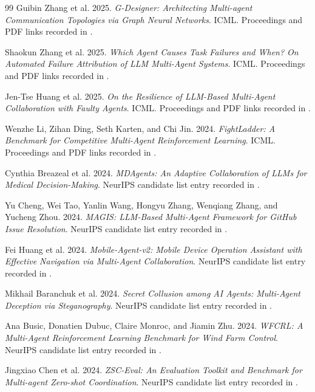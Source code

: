 \documentclass[11pt]{article}
\begin{document}
\begin{thebibliography}{99}
Guibin Zhang et al. 2025. \emph{G-Designer: Architecting Multi-agent Communication Topologies via Graph Neural Networks}. ICML. Proceedings and PDF links recorded in \cite{icml_list}.

Shaokun Zhang et al. 2025. \emph{Which Agent Causes Task Failures and When? On Automated Failure Attribution of LLM Multi-Agent Systems}. ICML. Proceedings and PDF links recorded in \cite{icml_list}.

Jen-Tse Huang et al. 2025. \emph{On the Resilience of LLM-Based Multi-Agent Collaboration with Faulty Agents}. ICML. Proceedings and PDF links recorded in \cite{icml_list}.

Wenzhe Li, Zihan Ding, Seth Karten, and Chi Jin. 2024. \emph{FightLadder: A Benchmark for Competitive Multi-Agent Reinforcement Learning}. ICML. Proceedings and PDF links recorded in \cite{icml_list}.

Cynthia Breazeal et al. 2024. \emph{MDAgents: An Adaptive Collaboration of LLMs for Medical Decision-Making}. NeurIPS candidate list entry recorded in \cite{neurips_list}.

Yu Cheng, Wei Tao, Yanlin Wang, Hongyu Zhang, Wenqiang Zhang, and Yucheng Zhou. 2024. \emph{MAGIS: LLM-Based Multi-Agent Framework for GitHub Issue Resolution}. NeurIPS candidate list entry recorded in \cite{neurips_list}.

Fei Huang et al. 2024. \emph{Mobile-Agent-v2: Mobile Device Operation Assistant with Effective Navigation via Multi-Agent Collaboration}. NeurIPS candidate list entry recorded in \cite{neurips_list}.

Mikhail Baranchuk et al. 2024. \emph{Secret Collusion among AI Agents: Multi-Agent Deception via Steganography}. NeurIPS candidate list entry recorded in \cite{neurips_list}.

Ana Busic, Donatien Dubuc, Claire Monroc, and Jiamin Zhu. 2024. \emph{WFCRL: A Multi-Agent Reinforcement Learning Benchmark for Wind Farm Control}. NeurIPS candidate list entry recorded in \cite{neurips_list}.

Jingxiao Chen et al. 2024. \emph{ZSC-Eval: An Evaluation Toolkit and Benchmark for Multi-agent Zero-shot Coordination}. NeurIPS candidate list entry recorded in \cite{neurips_list}.

\end{thebibliography}
\end{document}
